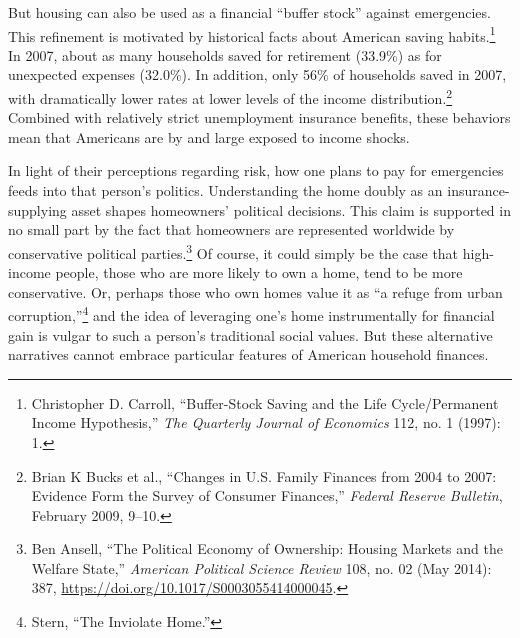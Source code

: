 \documentclass[12pt,oneside]{psthesis}
\begin{document}
But housing can also be used as a financial ``buffer stock'' against emergencies.
This refinement is motivated by historical facts about American saving habits.\footnote{Christopher D. Carroll, ``Buffer-Stock Saving and the Life Cycle/Permanent Income Hypothesis,'' \emph{The Quarterly Journal of Economics} 112, no. 1 (1997): 1.}
In 2007, about as many households saved for retirement (33.9\%) as for unexpected expenses (32.0\%).
In addition, only 56\% of households saved in 2007, with dramatically lower rates at lower levels of the income distribution.\footnote{Brian K Bucks et al., ``Changes in U.S. Family Finances from 2004 to 2007: Evidence Form the Survey of Consumer Finances,'' \emph{Federal Reserve Bulletin}, February 2009, 9--10.}
Combined with relatively strict unemployment insurance benefits, these behaviors mean that Americans are by and large exposed to income shocks.

In light of their perceptions regarding risk, how one plans to pay for emergencies feeds into that person's politics.
Understanding the home doubly as an insurance-supplying asset shapes homeowners' political decisions.
This claim is supported in no small part by the fact that homeowners are represented worldwide by conservative political parties.\footnote{Ben Ansell, ``The Political Economy of Ownership: Housing Markets and the Welfare State,'' \emph{American Political Science Review} 108, no. 02 (May 2014): 387, \url{https://doi.org/10.1017/S0003055414000045}.}
Of course, it could simply be the case that high-income people, those who are more likely to own a home, tend to be more conservative.
Or, perhaps those who own homes value it as ``a refuge from urban corruption,''\footnote{Stern, ``The Inviolate Home.''} and the idea of leveraging one's home instrumentally for financial gain is vulgar to such a person's traditional social values.
But these alternative narratives cannot embrace particular features of American household finances.
\end{document}
